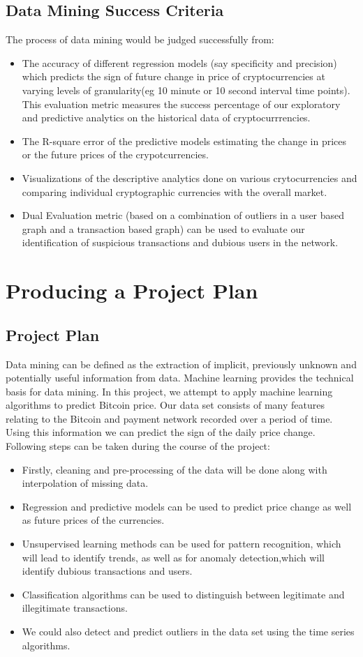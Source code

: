 \documentclass{article}
\begin{document}
\subsection{Data Mining Success Criteria}
The process of data mining would be judged successfully from:
\begin{itemize}
    \item The accuracy of different regression models (say specificity and precision) which predicts the sign of future change in price of cryptocurrencies at varying levels of granularity(eg 10 minute or 10 second interval time points). This evaluation metric measures the success percentage of our exploratory and predictive analytics on the historical data of cryptocurrrencies.
    \item The R-square error of the predictive models estimating the change in prices or the future prices of the crypotcurrencies.
    \item Visualizations of the descriptive analytics done on various crytocurrencies and comparing individual cryptographic currencies with the overall market.
    \item Dual Evaluation metric (based on a combination of outliers in a user based graph and a transaction based graph) can be used to evaluate our identification of suspicious transactions and dubious users in the network.
\end{itemize}

\section{Producing a Project Plan}
\subsection{Project Plan}
Data mining can be defined as the extraction of implicit, previously unknown and potentially useful information from data. Machine learning provides the technical basis for data mining. In this project, we attempt to apply machine learning algorithms to predict Bitcoin price. Our data set consists of many features relating to the Bitcoin and payment network recorded over a period of time. Using this information we can predict the sign of the daily price change. Following steps can be taken during the course of the project:
\begin{itemize}
    \item Firstly, cleaning and pre-processing of the data will be done along with interpolation of missing data.
    \item Regression and predictive models can be used to predict price change as well as future prices of the currencies.
    \item Unsupervised learning methods can be used for pattern recognition, which will lead to identify trends, as well as for anomaly detection,which will identify dubious transactions and users.
    \item Classification algorithms can be used to distinguish between legitimate and illegitimate transactions.
	\item We could also detect and predict outliers in the data set using the time series algorithms.
\end{itemize}
\end{document}
